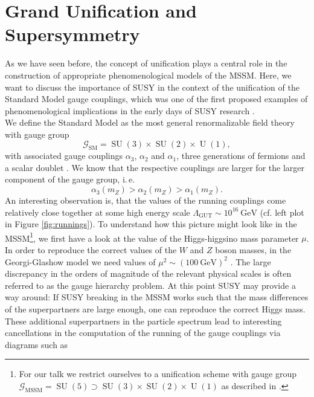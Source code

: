 \section{Grand Unification and Supersymmetry}
As we have seen before, the concept of unification plays a central role in the construction of appropriate phenomenological models of the MSSM. Here, we want to discuss the importance of SUSY in the context of the unification of the Standard Model gauge couplings, which was one of the first proposed examples of  phenomenological implications in the early days of SUSY research \cite{GeorgiGlashow1974}. \\
We define the Standard Model as the most general renormalizable field theory with gauge group
\begin{equation}
	\mathcal{G}_{\mathrm{SM}} = \operatorname{SU}(3) \times \operatorname{SU}(2) \times \operatorname{U}(1),
\end{equation}
with associated gauge couplings $\alpha_3$, $\alpha_2$ and $\alpha_1$, three generations of fermions and a scalar doublet \cite{Hebecker2020}. We know that the respective couplings are larger for the larger component of the gauge group, i.\,e. 
\begin{equation}
	\alpha_{3}\left(m_{Z}\right)>\alpha_{2}\left(m_{Z}\right)>\alpha_{1}\left(m_{Z}\right).
\end{equation}
An interesting observation is, that the values of the running couplings come relatively close together at some high energy scale $\Lambda_{\mathrm{GUT}}\sim 10^{16}\ \mathrm{GeV}$ (cf. left plot in Figure \ref{fig:runnings}). To understand how this picture might look like in the MSSM\footnote{For our talk we restrict ourselves to a unification scheme with gauge group  $\mathcal{G}_{\mathrm{MSSM}} = \operatorname{SU}(5) \supset \operatorname{SU}(3)\times\operatorname{SU}(2)\times\operatorname{U}(1)$ as described in \cite{GeorgiGlashow1974}.}, we first  have a look at the value of the Higgs-higgsino mass parameter $\mu$.\\ In order to reproduce the correct values of the $W$ and $Z$ boson masses, in the Georgi-Glashow model \cite{GeorgiGlashow1974} we need values of $\mu^{2} \sim (100\ \mathrm{GeV})^{2}$ \cite{PeskinSchroeder1995}. The large discrepancy in the orders of magnitude of the relevant physical scales is often referred to as the gauge hierarchy problem. At this point SUSY may provide a way around: If SUSY breaking in the MSSM works such that the mass differences of the superpartners are large enough, one can reproduce the correct Higgs mass. These additional superpartners in the particle spectrum lead to interesting cancellations in the computation of the running of the gauge couplings via diagrams such as 
